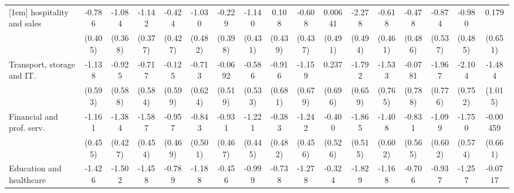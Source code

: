 {\begin{tabular}{l*{16}{c}}
[1em]
hospitality and sales&      -0.786         &      -1.084\sym{**} &      -1.142\sym{**} &      -0.424         &      -1.030\sym{*}  &      -0.229         &      -1.140\sym{**} &       0.108         &      -0.608         &     0.00641         &      -2.278\sym{***}&      -0.618         &      -0.478         &      -0.874         &      -0.980\sym{*}  &       0.179         \\
                    &     (0.405)         &     (0.368)         &     (0.377)         &     (0.427)         &     (0.482)         &     (0.398)         &     (0.431)         &     (0.439)         &     (0.437)         &     (0.491)         &     (0.494)         &     (0.461)         &     (0.486)         &     (0.537)         &     (0.485)         &     (0.651)         \\
[1em]
Transport, storage and IT.&      -1.138         &      -0.925         &      -0.717         &      -0.125         &      -0.713         &     -0.0692         &      -0.586         &      -0.916         &      -1.159         &       0.237         &      -1.792\sym{**} &      -1.533\sym{*}  &     -0.0781         &      -1.967\sym{*}  &      -2.104\sym{**} &      -1.484         \\
                    &     (0.593)         &     (0.588)         &     (0.584)         &     (0.599)         &     (0.624)         &     (0.519)         &     (0.533)         &     (0.681)         &     (0.679)         &     (0.696)         &     (0.659)         &     (0.765)         &     (0.788)         &     (0.776)         &     (0.752)         &     (1.015)         \\
[1em]
Financial and prof. serv.&      -1.161\sym{*}  &      -1.384\sym{**} &      -1.587\sym{***}&      -0.957\sym{*}  &      -0.843         &      -0.931\sym{*}  &      -1.221\sym{**} &      -0.383         &      -1.242\sym{**} &      -0.400         &      -1.865\sym{***}&      -1.408\sym{*}  &      -0.831         &      -1.099         &      -1.750\sym{**} &    -0.00459         \\
                    &     (0.455)         &     (0.427)         &     (0.454)         &     (0.469)         &     (0.501)         &     (0.467)         &     (0.445)         &     (0.482)         &     (0.456)         &     (0.526)         &     (0.515)         &     (0.602)         &     (0.565)         &     (0.602)         &     (0.574)         &     (0.661)         \\
[1em]
Education and healthcare&      -1.426\sym{**} &      -1.502\sym{***}&      -1.458\sym{***}&      -0.789         &      -1.188\sym{*}  &      -0.456         &      -0.999\sym{*}  &      -0.738         &      -1.278\sym{**} &      -0.324         &      -1.829\sym{***}&      -1.168\sym{*}  &      -0.706         &      -0.937         &      -1.257\sym{*}  &     -0.0717         \\

\end{tabular}}
